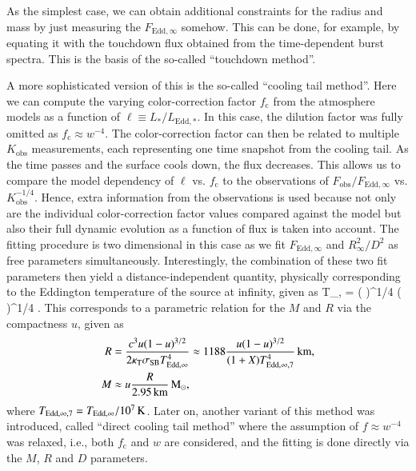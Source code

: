 As the simplest case, we can obtain additional constraints for the radius and mass by just measuring the $F_{\mathrm{Edd},\infty}$ somehow.
This can be done, for example, by equating it with the touchdown flux obtained from the time-dependent burst spectra.
This is the basis of the so-called ``touchdown method''.\cite{Ebi87, vParadijs90, Ozel06, Ozel16}

A more sophisticated version of this is the so-called ``cooling tail method''.\cite{SPRW11, PNK14}
Here we can compute the varying color-correction factor $f_{\mathrm{c}}$ from the atmosphere models as a function of $\ell \equiv L_*/L_{\mathrm{Edd,*}}$.
In this case, the dilution factor was fully omitted as $f_{\mathrm{c}} \approx w^{-4}$.
The color-correction factor can then be related to multiple $K_{\mathrm{obs}}$ measurements, each representing  one time snapshot from the cooling tail.
As the time passes and the surface cools down, the flux decreases.
This allows us to compare the model dependency of $\ell$ vs. $f_{\mathrm{c}}$ to the observations of $F_{\mathrm{obs}} / F_{\mathrm{Edd}, \infty}$ vs. $K_{\mathrm{obs}}^{-1/4}$.
Hence, extra information from the observations is used because not only are the individual color-correction factor values compared against the model but also their full dynamic evolution as a function of flux is taken into account.
The fitting procedure is two dimensional in this case as we fit $F_{\mathrm{Edd},\infty}$ and $R_{\infty}^2/D^2$ as free parameters simultaneously.
Interestingly, the combination of these two fit parameters then yield a distance-independent quantity, physically corresponding to the Eddington temperature of the source at infinity, given as
\be
T_{,\infty} 
= 
\left(  \right)^{1/4}
\left(   \right)^{1/4} 
\Kelvin.
\ee
This corresponds to a parametric relation for the $M$ and $R$ via the compactness $u$, given as
\begin{align}\begin{split}
R &= \frac{c^3 u(1-u)^{3/2}}{2\kappa_{\mathrm{T}} \sigma_{\mathrm{SB}} T_{\mathrm{Edd},\infty}^4} 
\approx 1188 \frac{u(1-u)^{3/2}}{(1+X) T_{\mathrm{Edd},\infty, 7}^4} \, \mathrm{km}, \\
M &\approx u \frac{R}{2.95\, \mathrm{km}} \, \mathrm{M}_{\odot}, \\
\end{split}\end{align}
where $T_{\mathrm{Edd},\infty,7} = T_{\mathrm{Edd}, \infty} / 10^7 \, \mathrm{K}$.
Later on, another variant of this method was introduced, called ``direct cooling tail method'' where the assumption of $f \approx w^{-4}$ was relaxed, i.e., both $f_{\mathrm{c}}$ and $w$ are considered, and the fitting is done directly via the $M$, $R$ and $D$ parameters.\cite{NSK16, SPN17} 


